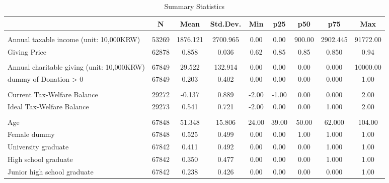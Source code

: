 \documentclass[ review  , 3p ]{elsarticle}
\begin{document}
  \begin{table}
  
  \caption{\label{tab:kableSummaryCovariate}Summary Statistics}
  \centering
  \fontsize{8}{10}\selectfont
  \begin{tabular}[t]{lcccccccc}
  \toprule
   & N & Mean & Std.Dev. & Min & p25 & p50 & p75 & Max\\
  \midrule
  \addlinespace[0.3em]
  \multicolumn{9}{l}{\textbf{Income and Giving Price}}\\
  \hspace{1em}Annual taxable income (unit: 10,000KRW) & 53269 & 1876.121 & 2700.965 & 0.00 & 0.00 & 900.00 & 2902.445 & 91772.00\\
  \hspace{1em}Giving Price & 62878 & 0.858 & 0.036 & 0.62 & 0.85 & 0.85 & 0.850 & 0.94\\
  \addlinespace[0.3em]
  \multicolumn{9}{l}{\textbf{Charitable Donations}}\\
  \hspace{1em}Annual charitable giving (unit: 10,000KRW) & 67849 & 29.522 & 132.914 & 0.00 & 0.00 & 0.00 & 0.000 & 10000.00\\
  \hspace{1em}dummy of Donation > 0 & 67849 & 0.203 & 0.402 & 0.00 & 0.00 & 0.00 & 0.000 & 1.00\\
  \addlinespace[0.3em]
  \multicolumn{9}{l}{\textbf{Government Efficiency}}\\
  \hspace{1em}Current Tax-Welfare Balance & 29272 & -0.137 & 0.889 & -2.00 & -1.00 & 0.00 & 0.000 & 2.00\\
  \hspace{1em}Ideal Tax-Welfare Balance & 29273 & 0.541 & 0.721 & -2.00 & 0.00 & 0.00 & 1.000 & 2.00\\
  \addlinespace[0.3em]
  \multicolumn{9}{l}{\textbf{Individual Characteristics}}\\
  \hspace{1em}Age & 67848 & 51.348 & 15.806 & 24.00 & 39.00 & 50.00 & 62.000 & 104.00\\
  \hspace{1em}Female dummy & 67848 & 0.525 & 0.499 & 0.00 & 0.00 & 1.00 & 1.000 & 1.00\\
  \hspace{1em}University graduate & 67842 & 0.411 & 0.492 & 0.00 & 0.00 & 0.00 & 1.000 & 1.00\\
  \hspace{1em}High school graduate & 67842 & 0.350 & 0.477 & 0.00 & 0.00 & 0.00 & 1.000 & 1.00\\
  \hspace{1em}Junior high school graduate & 67842 & 0.238 & 0.426 & 0.00 & 0.00 & 0.00 & 0.000 & 1.00\\
  \bottomrule
  \end{tabular}
  \end{table}
  
\end{document}
